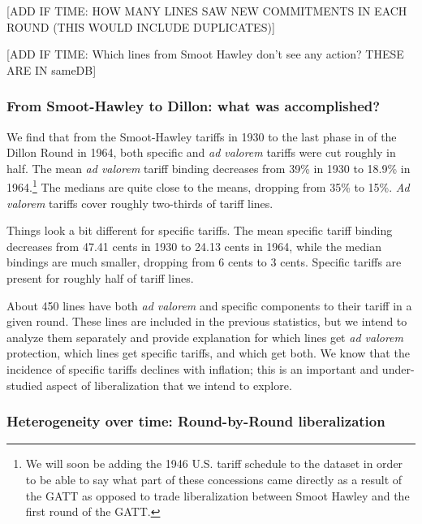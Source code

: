 \documentclass[
  12pt,
]{article}
\begin{document}
{[}ADD IF TIME: HOW MANY LINES SAW NEW COMMITMENTS IN EACH ROUND (THIS WOULD INCLUDE DUPLICATES){]}

{[}ADD IF TIME: Which lines from Smoot Hawley don't see any action? THESE ARE IN sameDB{]}

\hypertarget{from-smoot-hawley-to-dillon-what-was-accomplished}{%
\subsubsection{From Smoot-Hawley to Dillon: what was accomplished?}\label{from-smoot-hawley-to-dillon-what-was-accomplished}}

We find that from the Smoot-Hawley tariffs in 1930 to the last phase in of the Dillon Round in 1964, both specific and \emph{ad valorem} tariffs were cut roughly in half. The mean \emph{ad valorem} tariff binding decreases from 39\% in 1930 to 18.9\% in 1964.\footnote{We will soon be adding the 1946 U.S. tariff schedule to the dataset in order to be able to say what part of these concessions came directly as a result of the GATT as opposed to trade liberalization between Smoot Hawley and the first round of the GATT.} The medians are quite close to the means, dropping from 35\% to 15\%. \emph{Ad valorem} tariffs cover roughly two-thirds of tariff lines.

Things look a bit different for specific tariffs. The mean specific tariff binding decreases from 47.41 cents in 1930 to 24.13 cents in 1964, while the median bindings are much smaller, dropping from 6 cents to 3 cents. Specific tariffs are present for roughly half of tariff lines.

About 450 lines have both \emph{ad valorem} and specific components to their tariff in a given round. These lines are included in the previous statistics, but we intend to analyze them separately and provide explanation for which lines get \emph{ad valorem} protection, which lines get specific tariffs, and which get both. We know that the incidence of specific tariffs declines with inflation; this is an important and under-studied aspect of liberalization that we intend to explore.

\hypertarget{heterogeneity-over-time-round-by-round-liberalization}{%
\subsubsection{Heterogeneity over time: Round-by-Round liberalization}\label{heterogeneity-over-time-round-by-round-liberalization}}
\end{document}
